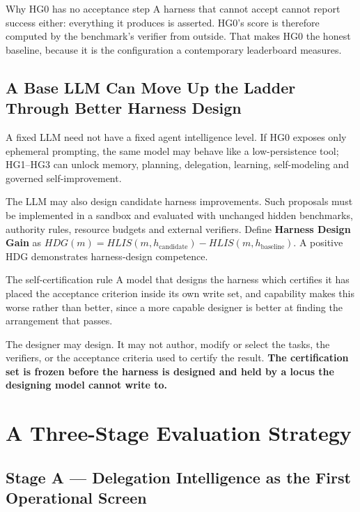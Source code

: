 \documentclass[11pt]{article}
\theoremstyle{definition}
\begin{document}
\begin{claimbox}{Why HG0 has no acceptance step}
A harness that cannot accept cannot report success either: everything it produces is asserted. HG0's score is therefore computed by the benchmark's verifier from outside. That makes HG0 the honest baseline, because it is the configuration a contemporary leaderboard measures.
\end{claimbox}

\subsection{A Base LLM Can Move Up the Ladder Through Better Harness Design}

A fixed LLM need not have a fixed agent intelligence level. If HG0 exposes only ephemeral prompting, the same model may behave like a low-persistence tool; HG1--HG3 can unlock memory, planning, delegation, learning, self-modeling and governed self-improvement.

The LLM may also design candidate harness improvements. Such proposals must be implemented in a sandbox and evaluated with unchanged hidden benchmarks, authority rules, resource budgets and external verifiers. Define \textbf{Harness Design Gain} as $HDG(m) = HLIS(m,h_{\text{candidate}}) - HLIS(m,h_{\text{baseline}})$. A positive HDG demonstrates harness-design competence.

\begin{cautionbox}{The self-certification rule}
A model that designs the harness which certifies it has placed the acceptance criterion inside its own write set, and capability makes this worse rather than better, since a more capable designer is better at finding the arrangement that passes.

The designer may design. It may not author, modify or select the tasks, the verifiers, or the acceptance criteria used to certify the result. \textbf{The certification set is frozen before the harness is designed and held by a locus the designing model cannot write to.}
\end{cautionbox}

\section{A Three-Stage Evaluation Strategy}

\subsection{Stage A --- Delegation Intelligence as the First Operational Screen}
\end{document}

